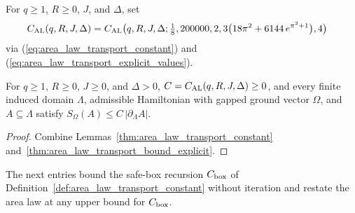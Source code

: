 \begin{definition}
    \label{def:area_law_closed_constant}
    \leanok
    For $q\ge1$, $R\ge0$, $J$, and $\Delta$, set
    \begin{align}
        C_{\rm AL}(q,R,J,\Delta)
         & =C_{\rm AL}\bigl(q,R,J,\Delta;\tfrac18,200000,2,
        3\bigl(18\pi^2+6144\,e^{\pi^2+1}\bigr),4\bigr)
        \label{eq:area_law_closed_constant}
    \end{align}
    via (\ref{eq:area_law_transport_constant}) and (\ref{eq:area_law_transport_explicit_values}).
\end{definition}

\begin{corollary}
    \label{thm:area_law_closed_constant}
    \leanok
    For $q\ge1$, $R\ge0$, $J\ge0$, and $\Delta>0$,
    $C=C_{\rm AL}(q,R,J,\Delta)\ge0$, and every finite induced domain $\Lambda$, admissible Hamiltonian with gapped ground vector $\Omega$, and $A\subseteq\Lambda$ satisfy
    $S_\Omega(A)\le C\,|\partial_\Lambda A|$.
\end{corollary}
\begin{proof}
    \leanok
    Combine Lemmas~\ref{thm:area_law_transport_constant} and~\ref{thm:area_law_transport_bound_explicit}.
\end{proof}

The next entries bound the safe-box recursion $C_{\rm box}$ of Definition~\ref{def:area_law_transport_constant} without iteration and restate the area law at any upper bound for $C_{\rm box}$.

